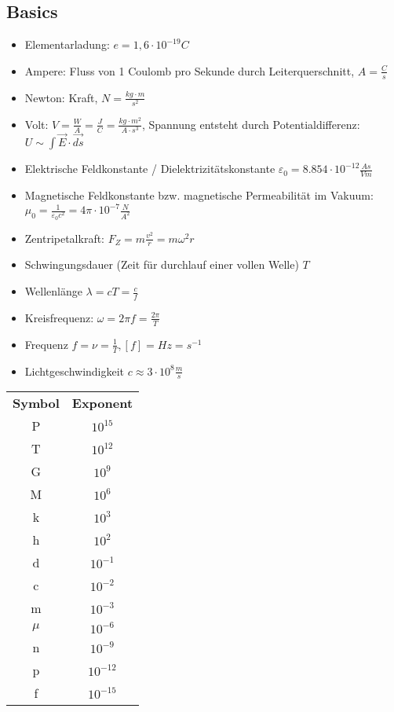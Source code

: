 \subsection*{Basics}
    \begin{itemize}
        \item Elementarladung: $e = 1,6 \cdot 10^{-19} C$
        \item Ampere: Fluss von 1 Coulomb pro Sekunde durch Leiterquerschnitt, $A = \frac{C}{s}$
        \item Newton: Kraft, $N = \frac{kg \cdot m}{s^2}$
        \item Volt: $V = \frac{W}{A} = \frac{J}{C} = \frac{kg \cdot m^2}{A \cdot s^3}$, Spannung entsteht durch Potentialdifferenz: $U \sim \int \overrightarrow{E} \cdot \overrightarrow{ds}$
        \item Elektrische Feldkonstante / Dielektrizitätskonstante $\varepsilon_0 = 8.854 \cdot 10^{-12} \frac{As}{Vm}$
        \item Magnetische Feldkonstante bzw. magnetische Permeabilität im Vakuum: $\mu_0 = \frac{1}{\varepsilon_0 c^2} = 4 \pi \cdot 10^{-7} \frac{N}{A^2}$
        \item Zentripetalkraft: $F_Z = m \frac{v^2}{r} = m \omega^2 r$
        \item Schwingungsdauer (Zeit für durchlauf einer vollen Welle) $T$
        \item Wellenlänge $\lambda = c T = \frac{c}{f}$
        \item Kreisfrequenz: $\omega = 2 \pi f = \frac{2 \pi}{T}$
        \item Frequenz $f = \nu = \frac{1}{T}, [f] = Hz = s^{-1}$
        \item Lichtgeschwindigkeit $c \approx 3 \cdot 10^8 \frac{m}{s}$
    \end{itemize}
    
    \begin{tabular}{c c}
        \textbf{Symbol} & \textbf{Exponent}\\
        P & $10^{15}$ \\
        T & $10^{12}$ \\
        G & $10^9$ \\
        M & $10^6$ \\
        k & $10^3$ \\
        h & $10^2$ \\
        d & $10^{-1}$ \\
        c & $10^{-2}$ \\
        m & $10^{-3}$ \\
        $\mu$ & $10^{-6}$ \\
        n & $10^{-9}$ \\
        p & $10^{-12}$ \\
        f & $10^{-15}$ \\
    \end{tabular}